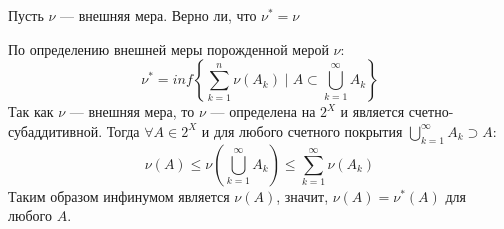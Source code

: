 \begin{task}{5}
	Пусть $\nu$ --- внешняя мера. Верно ли, что $\nu^* = \nu$
\end{task}

\begin{solution}
	По определению внешней меры порожденной мерой $\nu$:
	$$
	\nu^* = inf\left\{\sum_{k=1}^{n}\nu(A_k) \mid A \subset \bigcup_{k=1}^{\infty}A_k\right\}
	$$
	Так как $\nu$ --- внешняя мера, то $\nu$ --- определена на $2^X$ и является счетно-субаддитивной. Тогда $\forall A \in 2^X$ и для любого счетного покрытия $\bigcup_{k=1}^{\infty}A_k \supset A$: 
	$$
	\nu(A) \leq \nu\left(\bigcup_{k=1}^{\infty}A_k\right) \leq \sum_{k=1}^{\infty}\nu(A_k)
	$$
	Таким образом инфинумом является $\nu(A)$, значит, $\nu(A) = \nu^*(A)$ для любого $A$. 
	
\end{solution}